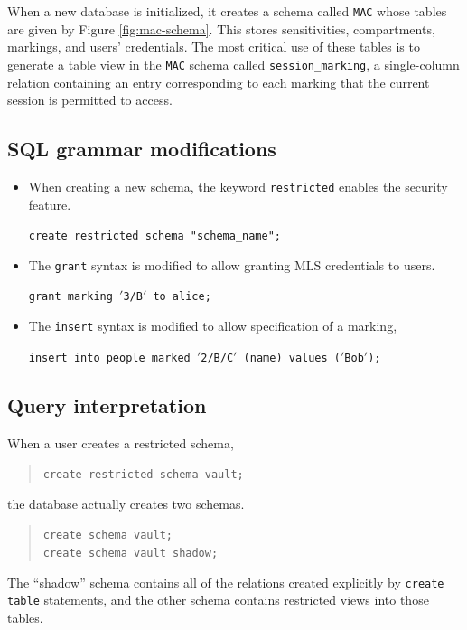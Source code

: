 \documentclass[twocolumn]{article}
\begin{document}
When a new database is initialized, it creates a schema called {\tt MAC} whose tables are given by Figure \ref{fig:mac-schema}. This stores sensitivities, compartments, markings, and users' credentials. The most critical use of these tables is to generate a table view in the {\tt MAC} schema called {\tt session\_marking}, a single-column relation containing an entry corresponding to each marking that the current session is permitted to access.

\subsection{SQL grammar modifications}

\begin{itemize}

\item When creating a new schema, the keyword {\tt restricted} enables the security feature.

{\tt create restricted schema "schema\_name";}

\item The {\tt grant} syntax is modified to allow granting MLS credentials to users.

{\tt grant marking $'$3/B$'$ to alice;}

\item The {\tt insert} syntax is modified to allow specification of a marking,

{\tt insert into people marked $'$2/B/C$'$ (name) values ($'$Bob$'$);}

\end{itemize}

\subsection{Query interpretation}

When a user creates a restricted schema,

\begin{quote}
{\tt create restricted schema vault;}
\end{quote}

the database actually creates two schemas.

\begin{quote}
{\tt create schema vault;\\
create schema vault\_shadow;}
\end{quote}

The ``shadow'' schema contains all of the relations created explicitly by {\tt create table} statements, and the other schema contains restricted views into those tables.
\end{document}
